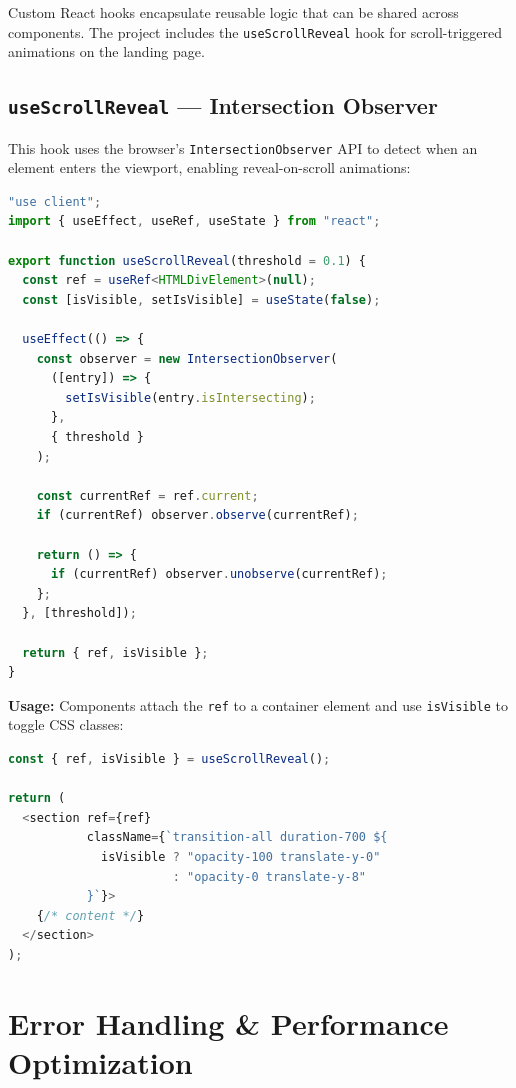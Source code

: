 \documentclass[12pt,a4paper]{article}
\begin{document}
Custom React hooks encapsulate reusable logic that can be shared across components. The project includes the \texttt{useScrollReveal} hook for scroll-triggered animations on the landing page.

\subsection{\texttt{useScrollReveal} — Intersection Observer}

This hook uses the browser's \texttt{IntersectionObserver} API to detect when an element enters the viewport, enabling reveal-on-scroll animations:

\begin{lstlisting}[language=TypeScript,title={useScrollReveal.ts — Complete implementation}]
"use client";
import { useEffect, useRef, useState } from "react";

export function useScrollReveal(threshold = 0.1) {
  const ref = useRef<HTMLDivElement>(null);
  const [isVisible, setIsVisible] = useState(false);

  useEffect(() => {
    const observer = new IntersectionObserver(
      ([entry]) => {
        setIsVisible(entry.isIntersecting);
      },
      { threshold }
    );

    const currentRef = ref.current;
    if (currentRef) observer.observe(currentRef);

    return () => {
      if (currentRef) observer.unobserve(currentRef);
    };
  }, [threshold]);

  return { ref, isVisible };
}
\end{lstlisting}

\textbf{Usage:} Components attach the \texttt{ref} to a container element and use \texttt{isVisible} to toggle CSS classes:

\begin{lstlisting}[language=TypeScript,title={Usage in a landing page section}]
const { ref, isVisible } = useScrollReveal();

return (
  <section ref={ref}
           className={`transition-all duration-700 ${
             isVisible ? "opacity-100 translate-y-0"
                       : "opacity-0 translate-y-8"
           }`}>
    {/* content */}
  </section>
);
\end{lstlisting}

\section{Error Handling \& Performance Optimization}
\end{document}
